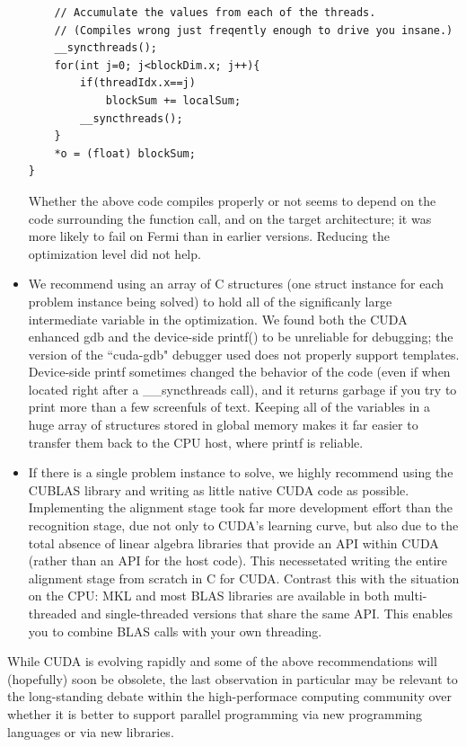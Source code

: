 \begin{itemize}
\begin{verbatim}
	// Accumulate the values from each of the threads. 
	// (Compiles wrong just freqently enough to drive you insane.)
	__syncthreads();
	for(int j=0; j<blockDim.x; j++){
		if(threadIdx.x==j)
			blockSum += localSum;
		__syncthreads();
	}
	*o = (float) blockSum;
}
\end{verbatim}
Whether the above code compiles properly or not seems to depend on the code surrounding the function call,
and on the target architecture; it was more likely to fail on Fermi than in earlier versions.  Reducing
the optimization level did not help.
\item We recommend using an array of C structures (one struct instance for each problem instance
being solved) to hold all of the significanly large intermediate variable in the optimization.  
We found both the CUDA enhanced gdb and the device-side printf() to be unreliable for debugging;
the version of the ``cuda-gdb" debugger used does not properly support templates.   Device-side printf sometimes
changed the behavior of the code (even if when located right after a \_\_syncthreads call), and it 
returns garbage if you try to print more than a few screenfuls of text. 
Keeping all of the variables in a huge array of structures stored in global memory makes it
far easier to transfer them back to the CPU host, where printf is reliable.
\item If there is a single problem instance to solve, we highly recommend using the CUBLAS library
and writing as little native CUDA code as possible.  Implementing the alignment stage took
far more development effort than the recognition stage, due not only to CUDA's learning curve,
but also due to the total absence of linear algebra libraries that provide an API within CUDA (rather than
an API for the host code).  This necessetated writing the entire alignment stage from scratch in C for CUDA.
Contrast this with the situation on the CPU: MKL and most BLAS libraries are available in both multi-threaded
and single-threaded versions that share the same API.  This enables you to combine BLAS calls with your own
threading.
\end{itemize}
While CUDA is evolving rapidly and some of the above recommendations will
(hopefully) soon be obsolete, the last observation in particular may be
relevant to the long-standing debate within the high-performace computing
community over whether it is better to support parallel programming via new
programming languages or via new libraries.

